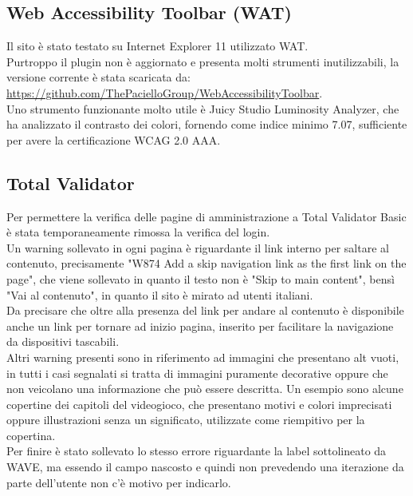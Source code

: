 \documentclass[openany, a4paper, 12pt]{report}
\begin{document}
			\subsection{Web Accessibility Toolbar (WAT)}
				Il sito è stato testato su Internet Explorer 11 utilizzato WAT.\\
				Purtroppo il plugin non è aggiornato e presenta molti strumenti inutilizzabili, la versione corrente è stata scaricata da:\\ \url{https://github.com/ThePacielloGroup/WebAccessibilityToolbar}.\\
				Uno strumento funzionante molto utile è Juicy Studio Luminosity Analyzer, che ha analizzato il contrasto dei colori, fornendo come indice minimo 7.07, sufficiente per avere la certificazione WCAG 2.0 AAA.\\

			\subsection{Total Validator}
				Per permettere la verifica delle pagine di amministrazione a Total Validator Basic è stata temporaneamente rimossa la verifica del login.\\
				Un warning sollevato in ogni pagina è riguardante il link interno per saltare al contenuto, precisamente "W874 Add a skip navigation link as the first link on the page", che viene sollevato in quanto il testo non è "Skip to main content", bensì "Vai al contenuto", in quanto il sito è mirato ad utenti italiani.\\
				Da precisare che oltre alla presenza del link per andare al contenuto è disponibile anche un link per tornare ad inizio pagina, inserito per facilitare la navigazione da dispositivi tascabili.\\
				Altri warning presenti sono in riferimento ad immagini che presentano alt vuoti, in tutti i casi segnalati si tratta di immagini puramente decorative oppure che non veicolano una informazione che può essere descritta. Un esempio sono alcune copertine dei capitoli del videogioco, che presentano motivi e colori imprecisati oppure illustrazioni senza un  significato, utilizzate come riempitivo per la copertina.\\
				Per finire è stato sollevato lo stesso errore riguardante la label sottolineato da WAVE, ma essendo il campo nascosto e quindi non prevedendo una iterazione da parte dell'utente non c'è motivo per indicarlo.\\
\end{document}
